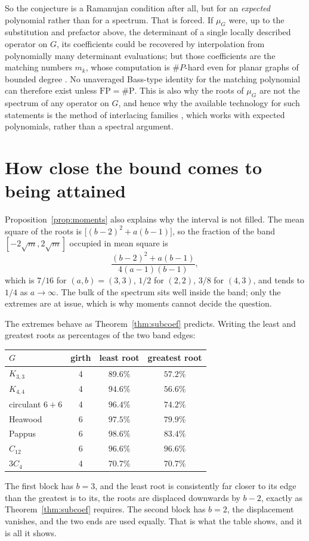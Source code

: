 \documentclass[11pt]{article}
\theoremstyle{remark}
\begin{document}
So the conjecture is a Ramanujan condition after all, but for an \emph{expected}
polynomial rather than for a spectrum. That is forced. If $\mu_G$ were, up to the
substitution and prefactor above, the determinant of a single locally described
operator on $G$, its coefficients could be recovered by interpolation from
polynomially many determinant evaluations; but those coefficients are the
matching numbers $m_k$, whose computation is $\#P$-hard even for planar graphs of
bounded degree \cite{Je}. No unaveraged Bass-type identity for the matching
polynomial can therefore exist unless $\mathrm{FP}=\#\mathrm P$. This is also why
the roots of $\mu_G$ are not the spectrum of any operator on $G$, and hence why
the available technology for such statements is the method of interlacing
families \cite{MSS}, which works with expected polynomials, rather than a
spectral argument.

\section{How close the bound comes to being attained}

Proposition~\ref{prop:moments} also explains why the interval is not filled. The
mean square of the roots is $\bigl[(b-2)^2+a(b-1)\bigr]$, so the fraction of the
band $[-2\sqrt m,2\sqrt m]$ occupied in mean square is
\[
\frac{(b-2)^2+a(b-1)}{4(a-1)(b-1)},
\]
which is $7/16$ for $(a,b)=(3,3)$, $1/2$ for $(2,2)$, $3/8$ for $(4,3)$, and
tends to $1/4$ as $a\to\infty$. The bulk of the spectrum sits well inside the
band; only the extremes are at issue, which is why moments cannot decide the
question.

The extremes behave as Theorem~\ref{thm:subcoef} predicts. Writing the least and
greatest roots as percentages of the two band edges:
\begin{center}
\begin{tabular}{lccc}
\hline
$G$ & girth & least root & greatest root\\
\hline
$K_{3,3}$ & 4 & $89.6\%$ & $57.2\%$\\
$K_{4,4}$ & 4 & $94.6\%$ & $56.6\%$\\
circulant $6+6$ & 4 & $96.4\%$ & $74.2\%$\\
Heawood & 6 & $97.5\%$ & $79.9\%$\\
Pappus & 6 & $98.6\%$ & $83.4\%$\\
\hline
$C_{12}$ & 6 & $96.6\%$ & $96.6\%$\\
$3C_4$ & 4 & $70.7\%$ & $70.7\%$\\
\hline
\end{tabular}
\end{center}
The first block has $b=3$, and the least root is consistently far closer to its
edge than the greatest is to its, the roots are displaced downwards by $b-2$,
exactly as Theorem~\ref{thm:subcoef} requires. The second block has $b=2$, the
displacement vanishes, and the two ends are used equally. That is what the table
shows, and it is all it shows.
\end{document}

